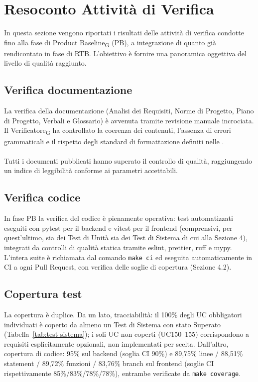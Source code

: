 \section{Resoconto Attività di Verifica}
In questa sezione vengono riportati i risultati delle attività di verifica condotte fino alla fase di Product Baseline\textsubscript{G} (PB), a integrazione di quanto già rendicontato in fase di RTB. L'obiettivo è fornire una panoramica oggettiva del livello di qualità raggiunto.

\subsection{Verifica documentazione}
La verifica della documentazione (Analisi dei Requisiti, Norme di Progetto, Piano di Progetto, Verbali e Glossario) è avvenuta tramite revisione manuale incrociata. Il Verificatore\textsubscript{G} ha controllato la coerenza dei contenuti, l'assenza di errori grammaticali e il rispetto degli standard di formattazione definiti nelle .
\\ \\
Tutti i documenti pubblicati hanno superato il controllo di qualità, raggiungendo un indice di leggibilità conforme ai parametri accettabili.

\subsection{Verifica codice}
In fase PB la verifica del codice è pienamente operativa: test automatizzati eseguiti con pytest per il backend e vitest per il frontend (comprensivi, per quest'ultimo, sia dei Test di Unità sia dei Test di Sistema di cui alla Sezione 4), integrati da controlli di qualità statica tramite eslint, prettier, ruff e mypy. L'intera suite è richiamata dal comando \texttt{make ci} ed eseguita automaticamente in CI a ogni Pull Request, con verifica delle soglie di copertura (Sezione 4.2).

\subsection{Copertura test}
La copertura è duplice. Da un lato, tracciabilità: il 100\% degli UC obbligatori individuati è coperto da almeno un Test di Sistema con stato Superato (Tabella~\ref{tab:test-sistema}); i soli UC non coperti (UC150--155) corrispondono a requisiti esplicitamente opzionali, non implementati per scelta. Dall'altro, copertura di codice: 95\% sul backend (soglia CI 90\%) e 89,75\% linee / 88,51\% statement / 89,72\% funzioni / 83,76\% branch sul frontend (soglie CI rispettivamente 85\%/83\%/78\%/78\%), entrambe verificate da \texttt{make coverage}.

